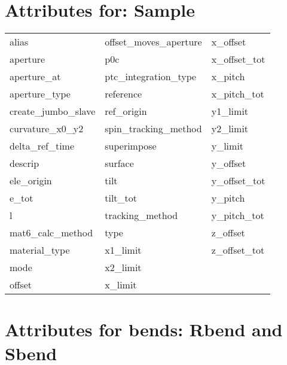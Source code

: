  \section{Attributes for: Sample}
 \label{s:list.sample}
 
 \begin{tabular}{lll} \toprule
alias                       & offset_moves_aperture       & x_offset                    \\
aperture                    & p0c                         & x_offset_tot                \\
aperture_at                 & ptc_integration_type        & x_pitch                     \\
aperture_type               & reference                   & x_pitch_tot                 \\
create_jumbo_slave          & ref_origin                  & y1_limit                    \\
curvature_x0_y2             & spin_tracking_method        & y2_limit                    \\
delta_ref_time              & superimpose                 & y_limit                     \\
descrip                     & surface                     & y_offset                    \\
ele_origin                  & tilt                        & y_offset_tot                \\
e_tot                       & tilt_tot                    & y_pitch                     \\
l                           & tracking_method             & y_pitch_tot                 \\
mat6_calc_method            & type                        & z_offset                    \\
material_type               & x1_limit                    & z_offset_tot                \\
mode                        & x2_limit                    &                             \\
offset                      & x_limit                     &                             \\
 \bottomrule
 \end{tabular}
 \vfill
 
 \section{Attributes for bends: Rbend and Sbend}
 \label{s:list.bend}
 
